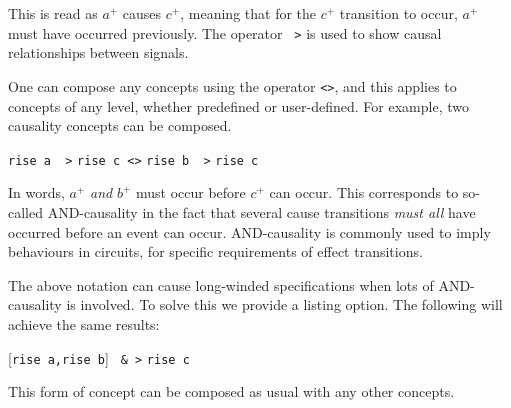 \documentclass[british,conference,compsoc]{IEEEtran}
\begin{document}
\vspace{-1mm}

This is read as $a^{+}$ causes $c^{+}$, meaning that for the $c^{+}$ transition 
to occur, $a^{+}$ must have occurred previously. The operator
\texttt{~>}
is used to show causal relationships between signals.
 

One can compose any concepts using the
operator \texttt{<>}, and this applies
to concepts of any level, whether predefined or user-defined. For example, 
two causality concepts can be composed.

\vspace{-1.5mm}

\begin{center}
\texttt{rise a ~>} \texttt{rise c <>} \texttt{rise b ~>} \texttt{rise c}
\end{center}

\vspace{-1mm}

In words, $a^{+}$ \emph{and} $b^{+}$ must occur before $c^{+}$ can occur. 
This corresponds to so-called AND-causality in the fact that several cause 
transitions \emph{must all} have occurred before an event can occur. 
AND-causality is commonly used to imply behaviours in circuits, for specific 
requirements of effect transitions.  

The above notation can cause long-winded specifications when lots of 
AND-causality is involved. To solve this we provide a listing option. The 
following will achieve the same results:

\vspace{-3mm}

\begin{center}
      [\texttt{rise a,}\texttt{rise b}] \texttt{~&~>} \texttt{rise c}
\end{center}

\vspace{-1mm}

This form of concept can be composed as usual with any other concepts.
\end{document}
